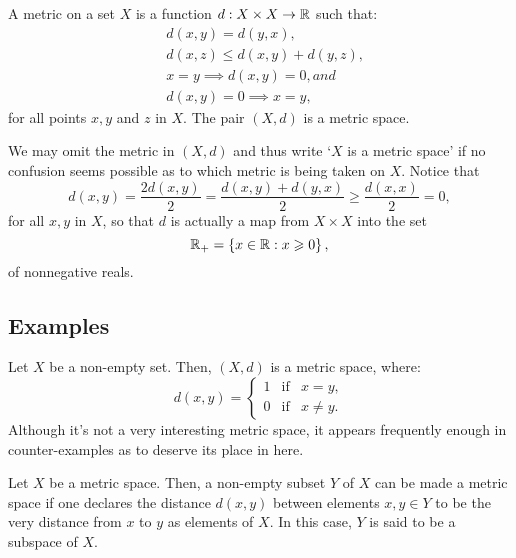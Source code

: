 \begin{definition}
  A metric on a set \(X\) is a function \(d:X\times{X}\to\mathbb{R}\) such that:
  \begin{align}
      & d(x,y)=d(y,x),                  \label{axiom:metric-space-01} \\
      & d(x,z)\leqslant{d(x,y)+d(y,z)}, \label{axiom:metric-space-02} \\
      & x=y\implies{d(x,y)=0}, and      \label{axiom:metric-space-03} \\
      & d(x,y)=0\implies{x=y},          \label{axiom:metric-space-04}
  \end{align}
  for all points \(x,y\) and \(z\) in \(X\). The pair \((X,d)\) is a metric
  space.
\end{definition}

We may omit the metric in \((X,d)\) and thus write `\(X\) is a metric space' if
no confusion seems possible as to which metric is being taken on \(X\). Notice
that
\[
  d(x,y)
  =
  \frac{2d(x,y)}{2}
  =
  \frac{d(x,y)+d(y,x)}{2}
  \geqslant
  \frac{d(x,x)}{2}
  =
  0,
\]
for all \(x,y\) in \(X\), so that \(d\) is actually a map from \(X\times{X}\)
into the set
\[
  \mathbb{R}_{+}
  =
  \left\{x\in\mathbb{R}:x\geqslant{0}\right\},
\]
of nonnegative reals.

\subsection{Examples}

\begin{example}\label{example:the-0-1-metric}
  Let \(X\) be a non-empty set. Then, \((X,d)\) is a metric space, where:
  \begin{equation*}
    d(x,y)=
    \left\{
      \begin{array}{lll}
        1 & \text{if} & x=y, \\
        0 & \text{if} & x\neq{y}.
      \end{array}
    \right.
  \end{equation*}
  Although it's not a very interesting metric space, it appears frequently
  enough in counter-examples as to deserve its place in here.
\end{example}

\begin{example}[Subspaces]\label{example:subspaces}
  Let \(X\) be a metric space. Then, a non-empty subset \(Y\) of \(X\) can be
  made a metric space if one declares the distance \(d(x,y)\) between elements
  \(x,y\in{Y}\) to be the very distance from \(x\) to \(y\) as elements of
  \(X\). In this case, \(Y\) is said to be a subspace of \(X\).
\end{example}

